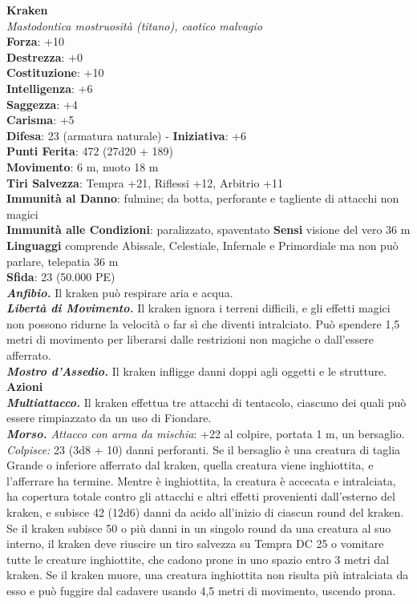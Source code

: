 \begin{multicols}{2}
\medskip\textbf{Kraken}\\
\emph{Mastodontica mostruosità (titano), caotico malvagio}\\
\textbf{Forza}: +10\\
\textbf{Destrezza}: +0\\
\textbf{Costituzione}: +10\\
\textbf{Intelligenza}: +6\\
\textbf{Saggezza}: +4\\
\textbf{Carisma}: +5\\
\textbf{Difesa}: 23 (armatura naturale) - \textbf{Iniziativa}: +6\\
\textbf{Punti Ferita}: 472 (27d20 + 189) \\
\textbf{Movimento}: 6 m, nuoto 18 m\\
\textbf{Tiri Salvezza}: Tempra +21, Riflessi +12, Arbitrio +11\\
\textbf{Immunità al Danno}: fulmine; da botta, perforante e tagliente di attacchi non magici\\
\textbf{Immunità alle Condizioni}: paralizzato, spaventato
\textbf{Sensi} visione del vero 36 m\\
\textbf{Linguaggi} comprende Abissale, Celestiale, Infernale e Primordiale ma non può parlare, telepatia 36 m \\
\textbf{Sfida}: 23 (50.000 PE)\smallskip\\
\emph{\textbf{Anfibio.}} Il kraken può respirare aria e acqua.\\
\emph{\textbf{Libertà di Movimento.}} Il kraken ignora i terreni difficili, e gli effetti magici non possono ridurne la velocità o far sì che diventi intralciato. Può spendere 1,5 metri di movimento per liberarsi dalle restrizioni non magiche o dall'essere afferrato.\\
\emph{\textbf{Mostro d'Assedio.}} Il kraken infligge danni doppi agli oggetti e le strutture.\\
\smallskip\textbf{Azioni}\\
\emph{\textbf{Multiattacco.}} Il kraken effettua tre attacchi di tentacolo, ciascuno dei quali può essere rimpiazzato da un uso di Fiondare.\\
\emph{\textbf{Morso.} Attacco con arma da mischia}: +22 al colpire, portata 1 m, un bersaglio.\\
\emph{Colpisce:} 23 (3d8 + 10) danni perforanti. Se il bersaglio è una creatura di taglia Grande o inferiore afferrato dal kraken, quella creatura viene inghiottita, e l'afferrare ha termine. Mentre è inghiottita, la creatura è accecata e intralciata, ha copertura totale contro gli attacchi e altri effetti provenienti dall'esterno del kraken, e subisce 42 (12d6) danni da acido all'inizio di ciascun round del kraken.\\
Se il kraken subisce 50 o più danni in un singolo round da una creatura al suo interno, il kraken deve riuscire un tiro salvezza su Tempra DC 25 o vomitare tutte le creature inghiottite, che cadono prone in uno spazio entro 3 metri dal kraken. Se il kraken muore, una creatura inghiottita non risulta più intralciata da esso e può fuggire dal cadavere usando 4,5 metri di movimento, uscendo prona.\\


\end{multicols}
